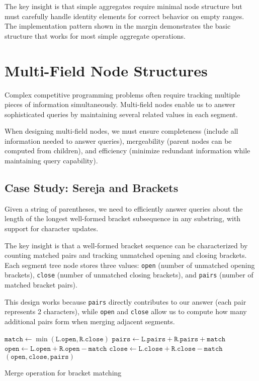 The key insight is that simple aggregates require minimal node structure but must carefully handle identity elements for correct behavior on empty ranges. The implementation pattern shown in the margin demonstrates the basic structure that works for most simple aggregate operations.

\section{Multi-Field Node Structures}

Complex competitive programming problems often require tracking multiple pieces of information simultaneously. Multi-field nodes enable us to answer sophisticated queries by maintaining several related values in each segment.

When designing multi-field nodes, we must ensure completeness (include all information needed to answer queries), mergeability (parent nodes can be computed from children), and efficiency (minimize redundant information while maintaining query capability).

\subsection{Case Study: Sereja and Brackets}


Given a string of parentheses, we need to efficiently answer queries about the length of the longest well-formed bracket subsequence in any substring, with support for character updates.

The key insight is that a well-formed bracket sequence can be characterized by counting matched pairs and tracking unmatched opening and closing brackets. Each segment tree node stores three values: \texttt{open} (number of unmatched opening brackets), \texttt{close} (number of unmatched closing brackets), and \texttt{pairs} (number of matched bracket pairs).

This design works because \texttt{pairs} directly contributes to our answer (each pair represents 2 characters), while \texttt{open} and \texttt{close} allow us to compute how many additional pairs form when merging adjacent segments.

\begin{algorithm}[H]
\SetAlgoLined
{}
\BlankLine
$\texttt{match} \gets \min(\texttt{L.open}, \texttt{R.close})$\;
$\texttt{pairs} \gets \texttt{L.pairs} + \texttt{R.pairs} + \texttt{match}$\;
$\texttt{open} \gets \texttt{L.open} + \texttt{R.open} - \texttt{match}$\;
$\texttt{close} \gets \texttt{L.close} + \texttt{R.close} - \texttt{match}$\;
\Return $(\texttt{open}, \texttt{close}, \texttt{pairs})$\;
\caption{Merge operation for bracket matching}
\end{algorithm}

